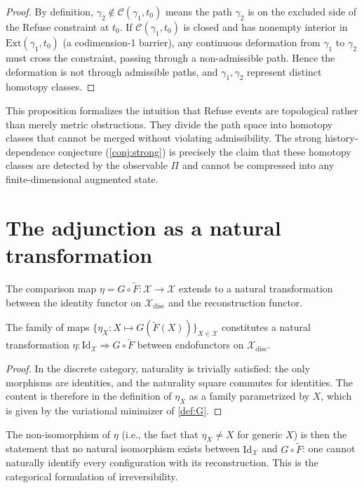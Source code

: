 \documentclass[12pt, oneside]{memoir}
\newcommand{\X}{\mathcal{X}}
\newcommand{\Ft}{\widetilde{F}}
\begin{document}
\begin{proof}
By definition, $\gamma_2 \notin \mathcal{C}(\gamma_1, t_0)$ means the path $\gamma_2$
is on the excluded side of the Refuse constraint at $t_0$.  If $\mathcal{C}(\gamma_1,
t_0)$ is closed and has nonempty interior in $\mathrm{Ext}(\gamma_1, t_0)$ (a
codimension-1 barrier), any continuous deformation from $\gamma_1$ to $\gamma_2$ must
cross the constraint, passing through a non-admissible path.  Hence the deformation is
not through admissible paths, and $\gamma_1, \gamma_2$ represent distinct homotopy
classes.
\end{proof}

\begin{remark}
This proposition formalizes the intuition that Refuse events are topological rather than
merely metric obstructions.  They divide the path space into homotopy classes that cannot
be merged without violating admissibility.  The strong history-dependence conjecture
(\cref{conj:strong}) is precisely the claim that these homotopy classes are detected by
the observable $\Pi$ and cannot be compressed into any finite-dimensional augmented state.
\end{remark}

\section{The adjunction as a natural transformation}

The comparison map $\eta = G \circ \Ft: \X \to \X$ extends to a natural transformation
between the identity functor on $\X_{\mathrm{disc}}$ and the reconstruction functor.

\begin{proposition}
\label{prop:natural}
The family of maps $\{\eta_X : X \mapsto G(\Ft(X))\}_{X \in \X}$ constitutes a natural
transformation $\eta: \mathrm{Id}_\X \Rightarrow G \circ \Ft$ between endofunctors on
$\X_{\mathrm{disc}}$.
\end{proposition}

\begin{proof}
In the discrete category, naturality is trivially satisfied: the only morphisms are
identities, and the naturality square commutes for identities.  The content is therefore
in the definition of $\eta_X$ as a family parametrized by $X$, which is given by the
variational minimizer of \cref{def:G}.
\end{proof}

The non-isomorphism of $\eta$ (i.e., the fact that $\eta_X \ne X$ for generic $X$) is
then the statement that no natural isomorphism exists between $\mathrm{Id}_\X$ and
$G \circ \Ft$: one cannot naturally identify every configuration with its reconstruction.
This is the categorical formulation of irreversibility.
\end{document}
